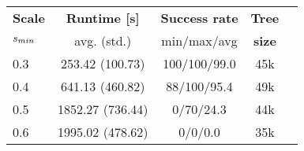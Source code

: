 \begin{tabular}{lcccc}
\toprule
{\bf Scale} & {\bf Runtime [s] } & {\bf Success rate} & {\bf Tree}\\ 
{$s_{min}$ }  & avg. (std.)       & min/max/avg & {\bf size } \\ 
\midrule
0.3 & 253.42 (100.73) & 100/100/99.0 & 45k  \\
0.4 & 641.13 (460.82) & 88/100/95.4 & 49k  \\
0.5 & 1852.27 (736.44) & 0/70/24.3 & 44k  \\
0.6 & 1995.02 (478.62) & 0/0/0.0 & 35k  \\
\bottomrule
\end{tabular}
